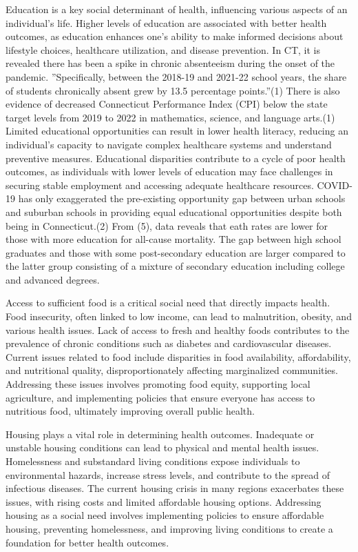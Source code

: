 \documentclass[12pt]{article}
\begin{document}
Education is a key social determinant
of health, influencing various aspects
of an individual's life. Higher levels
of education are associated with better
health outcomes, as education enhances
one's ability to make informed decisions
about lifestyle choices, healthcare
utilization, and disease prevention. In CT, it is revealed there has been a spike in chronic absenteeism during the onset of the pandemic.
''Specifically, between the 2018-19 and 2021-22 school years, the share of students chronically absent grew by 13.5 percentage points.''(1)
There is also evidence of decreased Connecticut Performance Index (CPI) below the state target levels from 2019 to 2022 in mathematics, science,
and language arts.(1)
Limited educational opportunities can
result in lower health literacy, reducing
an individual's capacity to navigate
complex healthcare systems and understand
preventive measures. Educational
disparities contribute to a cycle of
poor health outcomes, as individuals
with lower levels of education may face
challenges in securing stable employment
and accessing adequate healthcare
resources. COVID-19 has only exaggerated
the pre-existing opportunity gap between urban schools and suburban schools in providing equal educational
opportunities despite both being in Connecticut.(2)
From (5), data reveals that  eath rates are lower for those with more education for all-cause mortality. 
The gap between high school graduates and those with some post-secondary education are larger compared to the latter group consisting
of a mixture of secondary education including college and advanced degrees.

Access to sufficient
food is a critical social need that
directly impacts health. Food insecurity,
often linked to low income, can lead to
malnutrition, obesity, and various health
issues. Lack of access to fresh and
healthy foods contributes to the prevalence
of chronic conditions such as diabetes
and cardiovascular diseases. Current
issues related to food include disparities
in food availability, affordability, and
nutritional quality, disproportionately
affecting marginalized communities.
Addressing these issues involves promoting
food equity, supporting local agriculture,
and implementing policies that ensure
everyone has access to nutritious food,
ultimately improving overall public health.

Housing plays a vital role in determining
health outcomes. Inadequate or unstable
housing conditions can lead to physical
and mental health issues. Homelessness
and substandard living conditions expose
individuals to environmental hazards,
increase stress levels, and contribute
to the spread of infectious diseases.
The current housing crisis in many regions
exacerbates these issues, with rising
costs and limited affordable housing
options. Addressing housing as a social
need involves implementing policies to
ensure affordable housing, preventing
homelessness, and improving living
conditions to create a foundation for
better health outcomes.
\end{document}

